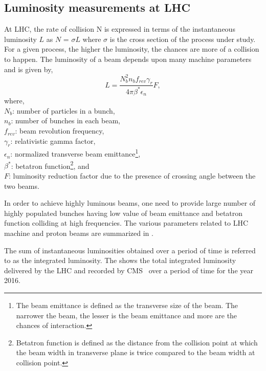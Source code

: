 \subsection{Luminosity measurements at LHC}
At LHC, the rate of collision N is expressed in terms of the instantaneous luminosity $L$ as $N$ = ${\sigma}L$ where $\sigma$ is the cross section of
the process under study. For a given process, the higher the luminosity, the
chances are more of a collision to happen. The luminosity of a beam depends upon many machine parameters and is given by,
\begin{equation}
  L = \frac{N^{2}_{b}n_{b}f_{rev}\gamma_{r}}{4\pi\beta^{\ast}\epsilon_{n}}F, 
\end{equation}
where, \\
$N_{b}$: number of particles in a bunch,\\
$n_{b}$: number of bunches in each beam,\\
$f_{rev}$: beam revolution frequency,\\
$\gamma_{r}$: relativistic gamma factor,\\
$\epsilon_{n}$: normalized transverse beam emittance\footnote{The beam emittance is defined as the transverse size of the beam. The narrower the beam, the lesser
  is the beam emittance and more are the chances of interaction.},\\
$\beta^{\ast}$: betatron function\footnote{Betatron function is defined as the distance from the
  collision point at which the beam width in transverse plane is twice compared to the beam width at collision point.}, and\\
$F$: luminosity reduction factor due to the presence of crossing angle between the two beams.

In order to achieve highly luminous beams, one need to provide large number of highly populated bunches
having low value of beam emittance and betatron function colliding at high frequencies. The various parameters related to LHC machine and proton beams
are summarized in \tab{\ref{Table:LHCParameters}}.


The sum of instantaneous luminosities obtained over a period of time is referred to as the integrated luminosity. The \fig{\ref{fig:LHCLumi}} shows
the total integrated luminosity delivered by the LHC and recorded by CMS~\cite{Web:CMSLumi} over a period of time for the year 2016.

